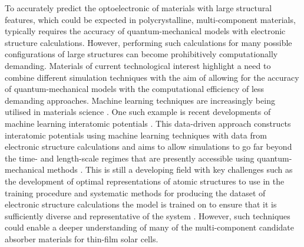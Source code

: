 \documentclass[11pt, twoside]{report}
\begin{document}
To accurately predict the optoelectronic of materials with large structural features, which could be expected in polycrystalline, multi-component materials, typically requires the accuracy of quantum-mechanical models with electronic structure calculations. However, performing such calculations for many possible configurations of large structures can become prohibitively computationally demanding.
Materials of current technological interest highlight a need to combine different simulation techniques with the aim of allowing for the accuracy of quantum-mechanical models with the computational efficiency of less demanding approaches. Machine learning techniques are increasingly being utilised in materials science \cite{Mueller2016, Keith_ML}. One such example is recent developments of machine learning interatomic potentials \cite{MLIP_chap, Behler2015}. This data-driven approach constructs interatomic potentials using machine learning techniques with data from electronic structure calculations and aims to allow simulations to go far beyond the time- and length-scale regimes that are presently accessible using quantum-mechanical methods \cite{MLIP}.
This is still a developing field with key challenges such as the development of optimal representations of atomic structures to use in the training procedure and systematic methods for producing the dataset of electronic structure calculations the model is trained on to ensure that it is sufficiently diverse and representative of the system \cite{MLIP_chap}. However, such techniques could enable a deeper understanding of many of the multi-component candidate absorber materials for thin-film solar cells.





\appendix

%

%
\end{document}
